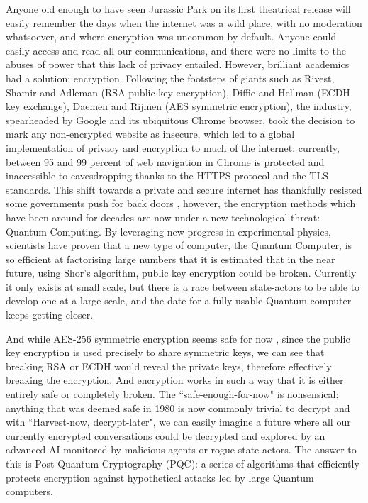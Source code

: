 \documentclass[11pt, letterpaper]{article}
\begin{document}
Anyone old enough to have seen Jurassic Park on its first theatrical release will easily remember the days when the internet was a wild place, with no moderation whatsoever, and where encryption was uncommon by default. Anyone could easily access and read all our communications, and there were no limits to the abuses of power that this lack of privacy entailed. However, brilliant academics had a solution: encryption. Following the footsteps of giants such as Rivest, Shamir and Adleman (RSA public key encryption), Diffie and Hellman (ECDH key exchange), Daemen and Rijmen (AES symmetric encryption), the industry, spearheaded by Google and its ubiquitous Chrome browser, took the decision to mark any non-encrypted website as insecure, which led to a global implementation of privacy and encryption to much of the internet: currently, between 95 and 99 percent of web navigation in Chrome is protected and inaccessible to eavesdropping thanks to the HTTPS protocol and the TLS standards. \cite{thompson2025https}
This shift towards a private and secure internet has thankfully resisted some governments push for back doors \cite{kleinman2025apple}, however, the encryption methods which have been around for decades are now under a new technological threat: Quantum Computing. \cite{buchanan2025quantum}
By leveraging new progress in experimental physics, scientists have proven that a new type of computer, the Quantum Computer, is so efficient at factorising large numbers that it is estimated that in the near future, using Shor’s \cite{shor1994algorithms} algorithm, public key encryption could be broken. Currently it only exists at small scale, but there is a race between state-actors to be able to develop one at a large scale, and the date for a fully usable Quantum computer keeps getting closer. \cite{buchanan2026qday}

And while AES-256 symmetric encryption seems safe for now \cite{buchanan2023aes}, since the public key encryption is used precisely to share symmetric keys, we can see that breaking RSA or ECDH would reveal the private keys, therefore effectively breaking the encryption. And encryption works in such a way that it is either entirely safe or completely broken. The “safe-enough-for-now" is nonsensical: anything that was deemed safe in 1980 is now commonly trivial to decrypt and with “Harvest-now, decrypt-later", we can easily imagine a future where all our currently encrypted conversations could be decrypted and explored by an advanced AI monitored by malicious agents or rogue-state actors. \cite{enisa2021current}
The answer to this is Post Quantum Cryptography (PQC): a series of algorithms that efficiently protects encryption against hypothetical attacks led by large Quantum computers.
\end{document}
